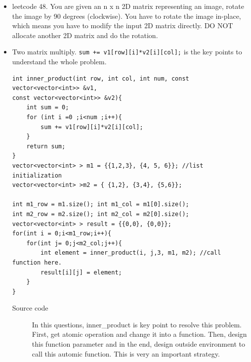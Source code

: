 \documentclass[a4paper,11pt,twoside]{book}
\begin{document}
\begin{itemize}
	
	\item leetcode 48. You are given an n x n 2D matrix representing an image, rotate the image by 90 degrees (clockwise). You have to rotate the image in-place, which means you have to modify the input 2D matrix directly. DO NOT allocate another 2D matrix and do the rotation.
	
	\item Two matrix multiply. \texttt{sum += v1[row][i]*v2[i][col];} is the key points to understand the whole problem. 
\begin{lstlisting}[]
int inner_product(int row, int col, int num, const vector<vector<int>> &v1, 
const vector<vector<int>> &v2){
	int sum = 0;
	for (int i =0 ;i<num ;i++){
		sum += v1[row][i]*v2[i][col];
	}
	return sum;
}
vector<vector<int> > m1 = {{1,2,3}, {4, 5, 6}}; //list initialization
vector<vector<int> >m2 = { {1,2}, {3,4}, {5,6}};

int m1_row = m1.size(); int m1_col = m1[0].size();
int m2_row = m2.size(); int m2_col = m2[0].size();
vector<vector<int> > result = {{0,0}, {0,0}};
for(int i = 0;i<m1_row;i++){
	for(int j= 0;j<m2_col;j++){
		int element = inner_product(i, j,3, m1, m2); //call function here.
		result[i][j] = element;
	}
}		
\end{lstlisting}
	
	\begin{description}	
		\item[Source code] In this questions, inner\_product is key point to resolve this problem. First, get atomic operation and change it into a function. Then, design this function parameter and in the end, design outside environment to call this automic function. This is very an important strategy. 
	\end{description}
	

\end{itemize}
\end{document}

